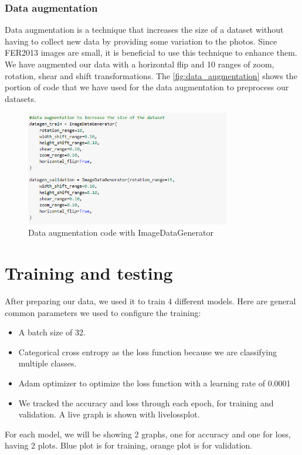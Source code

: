 \documentclass[12pt,a4paper,oneside,english]{book}
\begin{document}
\subsubsection{Data augmentation}
Data augmentation is a technique that increases the size of a dataset without having to
collect new data by providing some variation to the photos. Since FER2013 images are small, it is beneficial to use this technique to enhance them. We have augmented our data with a horizontal flip and 10 ranges of zoom, rotation, shear and shift transformations. The \autoref{fig:data_augmentation} shows the portion of
code that we have used for the data augmentation to preprocess our datasets.
\begin{figure}[H]
    \centering
    \includegraphics[width=0.8\textwidth]{figures/model/data augmentation.jpg}
    \caption{Data augmentation code with ImageDataGenerator}
    \label{fig:data_augmentation}
\end{figure}

\section{Training and testing}
After preparing our data, we used it to train 4 different models. Here are general common parameters we used to configure the training:
\begin{itemize}
\item A batch size of 32.
\item Categorical cross entropy as the loss function because we are classifying multiple classes.
\item Adam optimizer to optimize the loss function with a learning rate of 0.0001
\item We tracked the accuracy and loss through each epoch, for training and validation. A live graph is shown with livelossplot.
\end{itemize}
For each model, we will be showing 2 graphs, one for accuracy and one for loss, having 2 plots. Blue plot is for training, orange plot is for validation.
\end{document}
